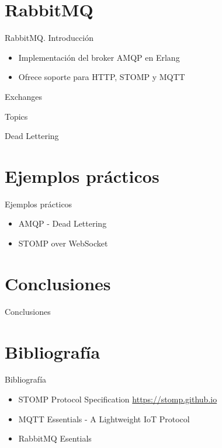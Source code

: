 \documentclass{beamer}
\begin{document}
  \section{RabbitMQ}
  \begin{frame}{RabbitMQ. Introducción}
    \begin{itemize}
      \item Implementación del broker AMQP en Erlang
      \item Ofrece soporte para HTTP, STOMP y MQTT
    \end{itemize}
  \end{frame}

  \begin{frame}{Exchanges}

  \end{frame}

  \begin{frame}{Topics}

  \end{frame}

  \begin{frame}{Dead Lettering}

  \end{frame}

  \section{Ejemplos prácticos}
  \begin{frame}{Ejemplos prácticos}
    \begin{itemize}
      \item AMQP - Dead Lettering
      \item STOMP over WebSocket
    \end{itemize}
  \end{frame}

  \section{Conclusiones}
  \begin{frame}{Conclusiones}

  \end{frame}

  \section{Bibliografía}
  \begin{frame}{Bibliografía}
    \begin{itemize}
      \item STOMP Protocol Specification \url{https://stomp.github.io}
      \item MQTT Essentials - A Lightweight IoT Protocol
      \item RabbitMQ Esentials
    \end{itemize}
  \end{frame}
\end{document}
